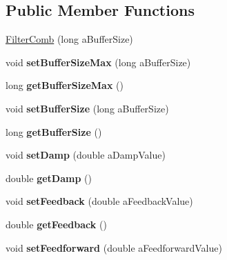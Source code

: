 \subsection*{Public Member Functions}
\begin{DoxyCompactItemize}
\item 
\hyperlink{class_filter_comb_afe69ff10a4879955dd26d86a6cf65696}{Filter\-Comb} (long a\-Buffer\-Size)
\item 
\hypertarget{class_filter_comb_af10d07c5f9b2dec74fa59f8545dadae7}{void {\bfseries set\-Buffer\-Size\-Max} (long a\-Buffer\-Size)}\label{class_filter_comb_af10d07c5f9b2dec74fa59f8545dadae7}

\item 
\hypertarget{class_filter_comb_a515055889a74f1ba7394508e81321b95}{long {\bfseries get\-Buffer\-Size\-Max} ()}\label{class_filter_comb_a515055889a74f1ba7394508e81321b95}

\item 
\hypertarget{class_filter_comb_a4b1a72c93e8cdde555a7d99aa4af3d74}{void {\bfseries set\-Buffer\-Size} (long a\-Buffer\-Size)}\label{class_filter_comb_a4b1a72c93e8cdde555a7d99aa4af3d74}

\item 
\hypertarget{class_filter_comb_ac8fa5e763c12687dd7acdb089c0c538f}{long {\bfseries get\-Buffer\-Size} ()}\label{class_filter_comb_ac8fa5e763c12687dd7acdb089c0c538f}

\item 
\hypertarget{class_filter_comb_ad98f3eed54312e7221c6d186fee53d2c}{void {\bfseries set\-Damp} (double a\-Damp\-Value)}\label{class_filter_comb_ad98f3eed54312e7221c6d186fee53d2c}

\item 
\hypertarget{class_filter_comb_aa554328928b1fa7bb8dcf9ca02ddf178}{double {\bfseries get\-Damp} ()}\label{class_filter_comb_aa554328928b1fa7bb8dcf9ca02ddf178}

\item 
\hypertarget{class_filter_comb_a3fa50be9caba717e072a3cd917d18255}{void {\bfseries set\-Feedback} (double a\-Feedback\-Value)}\label{class_filter_comb_a3fa50be9caba717e072a3cd917d18255}

\item 
\hypertarget{class_filter_comb_a581a46b00fc03391075846764dc20cd8}{double {\bfseries get\-Feedback} ()}\label{class_filter_comb_a581a46b00fc03391075846764dc20cd8}

\item 
\hypertarget{class_filter_comb_a414a7d1fbdc2172ea6dfce5759ea63a5}{void {\bfseries set\-Feedforward} (double a\-Feedforward\-Value)}\label{class_filter_comb_a414a7d1fbdc2172ea6dfce5759ea63a5}


\end{DoxyCompactItemize}
